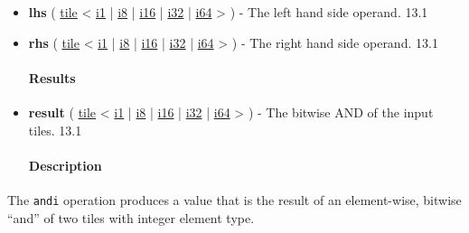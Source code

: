 \documentclass{article}
\begin{document}
\begin{itemize}
\item \textbf{lhs} ( \href{https://docs.nvidia.com/cuda/tile-ir/latest/sections/types.html#type-tile}{tile} < \href{https://docs.nvidia.com/cuda/tile-ir/latest/sections/types.html#subsection-element-types}{i1} | \href{https://docs.nvidia.com/cuda/tile-ir/latest/sections/types.html#subsection-element-types}{i8} | \href{https://docs.nvidia.com/cuda/tile-ir/latest/sections/types.html#subsection-element-types}{i16} | \href{https://docs.nvidia.com/cuda/tile-ir/latest/sections/types.html#subsection-element-types}{i32} | \href{https://docs.nvidia.com/cuda/tile-ir/latest/sections/types.html#subsection-element-types}{i64} > ) - The left hand side operand. 13.1
\item \textbf{rhs} ( \href{https://docs.nvidia.com/cuda/tile-ir/latest/sections/types.html#type-tile}{tile} < \href{https://docs.nvidia.com/cuda/tile-ir/latest/sections/types.html#subsection-element-types}{i1} | \href{https://docs.nvidia.com/cuda/tile-ir/latest/sections/types.html#subsection-element-types}{i8} | \href{https://docs.nvidia.com/cuda/tile-ir/latest/sections/types.html#subsection-element-types}{i16} | \href{https://docs.nvidia.com/cuda/tile-ir/latest/sections/types.html#subsection-element-types}{i32} | \href{https://docs.nvidia.com/cuda/tile-ir/latest/sections/types.html#subsection-element-types}{i64} > ) - The right hand side operand. 13.1


\paragraph{Results}

\item \textbf{result} ( \href{https://docs.nvidia.com/cuda/tile-ir/latest/sections/types.html#type-tile}{tile} < \href{https://docs.nvidia.com/cuda/tile-ir/latest/sections/types.html#subsection-element-types}{i1} | \href{https://docs.nvidia.com/cuda/tile-ir/latest/sections/types.html#subsection-element-types}{i8} | \href{https://docs.nvidia.com/cuda/tile-ir/latest/sections/types.html#subsection-element-types}{i16} | \href{https://docs.nvidia.com/cuda/tile-ir/latest/sections/types.html#subsection-element-types}{i32} | \href{https://docs.nvidia.com/cuda/tile-ir/latest/sections/types.html#subsection-element-types}{i64} > ) - The bitwise AND of the input tiles. 13.1


\paragraph{Description}

\end{itemize}
The \texttt{andi} operation produces a value that is the result of an element-wise, bitwise ``and'' of two tiles with integer element type.
\end{document}
